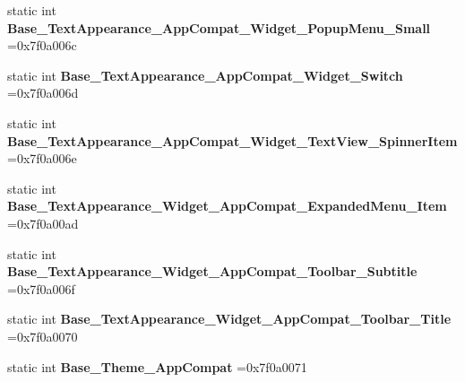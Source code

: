 \begin{DoxyCompactItemize}
\item 
\mbox{\label{classandroid_1_1support_1_1v7_1_1appcompat_1_1R_1_1style_a9f5ef99a715f8dfe42ee50657764a2b3}} 
static int {\bfseries Base\+\_\+\+Text\+Appearance\+\_\+\+App\+Compat\+\_\+\+Widget\+\_\+\+Popup\+Menu\+\_\+\+Small} =0x7f0a006c
\item 
\mbox{\label{classandroid_1_1support_1_1v7_1_1appcompat_1_1R_1_1style_a93d7c4ec4e4a512cf645687e58d57632}} 
static int {\bfseries Base\+\_\+\+Text\+Appearance\+\_\+\+App\+Compat\+\_\+\+Widget\+\_\+\+Switch} =0x7f0a006d
\item 
\mbox{\label{classandroid_1_1support_1_1v7_1_1appcompat_1_1R_1_1style_a4020b953d58ad6c2b5da34d24f45e4fb}} 
static int {\bfseries Base\+\_\+\+Text\+Appearance\+\_\+\+App\+Compat\+\_\+\+Widget\+\_\+\+Text\+View\+\_\+\+Spinner\+Item} =0x7f0a006e
\item 
\mbox{\label{classandroid_1_1support_1_1v7_1_1appcompat_1_1R_1_1style_a1b980ee6736e27cfb5a0029d91f997ab}} 
static int {\bfseries Base\+\_\+\+Text\+Appearance\+\_\+\+Widget\+\_\+\+App\+Compat\+\_\+\+Expanded\+Menu\+\_\+\+Item} =0x7f0a00ad
\item 
\mbox{\label{classandroid_1_1support_1_1v7_1_1appcompat_1_1R_1_1style_aaa984a73552c8bcea97ff7daef9706ec}} 
static int {\bfseries Base\+\_\+\+Text\+Appearance\+\_\+\+Widget\+\_\+\+App\+Compat\+\_\+\+Toolbar\+\_\+\+Subtitle} =0x7f0a006f
\item 
\mbox{\label{classandroid_1_1support_1_1v7_1_1appcompat_1_1R_1_1style_ab61ef8604395c19bdff189c6f80f2cb9}} 
static int {\bfseries Base\+\_\+\+Text\+Appearance\+\_\+\+Widget\+\_\+\+App\+Compat\+\_\+\+Toolbar\+\_\+\+Title} =0x7f0a0070
\item 
\mbox{\label{classandroid_1_1support_1_1v7_1_1appcompat_1_1R_1_1style_a87212f8450c0fa5aef1063ef08c0ec3d}} 
static int {\bfseries Base\+\_\+\+Theme\+\_\+\+App\+Compat} =0x7f0a0071

\end{DoxyCompactItemize}
